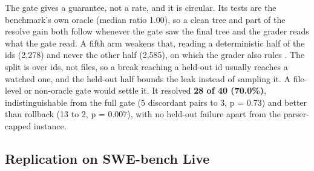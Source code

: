 \documentclass{article}
\begin{document}
The gate gives a guarantee, not a rate, and it is circular. Its tests are the benchmark's own oracle (median ratio 1.00), so a clean tree and part of the resolve gain both follow whenever the gate saw the final tree and the grader reads what the gate read. A fifth arm weakens that, reading a deterministic half of the ids (2,278) and never the other half (2,585), on which the grader also rules \cite{ref44}. The split is over ids, not files, so a break reaching a held-out id usually reaches a watched one, and the held-out half bounds the leak instead of sampling it. A file-level or non-oracle gate would settle it. It resolved \textbf{28 of 40 (70.0\%)}, indistinguishable from the full gate (5 discordant pairs to 3, p = 0.73) and better than rollback (13 to 2, p = 0.007), with no held-out failure apart from the parser-capped instance.

\subsection{Replication on SWE-bench Live}
\end{document}
